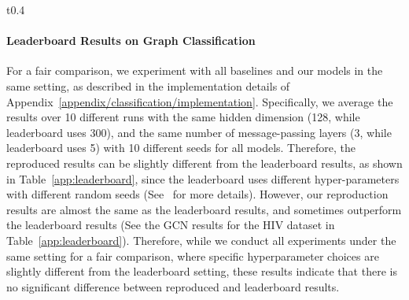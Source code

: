 \begin{wraptable}{t}{0.4\textwidth}
    \vspace{-0.3in}
    \small
    \centering
    \caption{\small Graph classification results for OGB test datasets with standard deviations.}
    \vskip -0.15in
    \label{app:leaderboard}
\end{wraptable}

\paragraph{Leaderboard Results on Graph Classification}
For a fair comparison, we experiment with all baselines and our models in the same setting, as described in the implementation details of Appendix~\ref{appendix/classification/implementation}. Specifically, we average the results over 10 different runs with the same hidden dimension (128, while leaderboard uses 300), and the same number of message-passing layers (3, while leaderboard uses 5) with 10 different seeds for all models. Therefore, the reproduced results can be slightly different from the leaderboard results, as shown in Table~\ref{app:leaderboard}, since the leaderboard uses different hyper-parameters with different random seeds (See~\cite{OGB} for more details). However, our reproduction results are almost the same as the leaderboard results, and sometimes outperform the leaderboard results (See the GCN results for the HIV dataset in Table~\ref{app:leaderboard}). Therefore, while we conduct all experiments under the same setting for a fair comparison, where specific hyperparameter choices are slightly different from the leaderboard setting, these results indicate that there is no significant difference between reproduced and leaderboard results.


